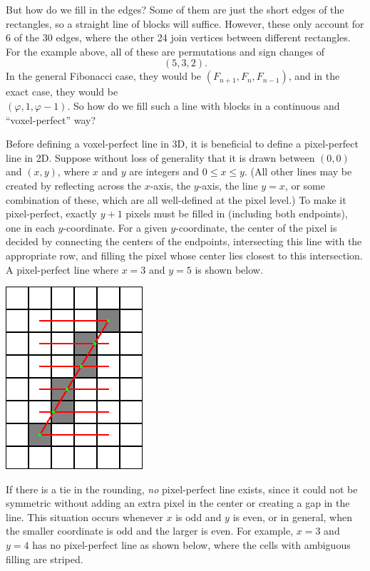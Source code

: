 \documentclass{article}
\begin{document}
But how do we fill in the edges?
Some of them are just the short edges of the rectangles,
so a straight line of blocks will suffice.
However, these only account for 6 of the 30 edges,
where the other 24 join vertices between different rectangles.
For the example above,
all of these are permutations and sign changes of
\[(5, 3, 2).\]
In the general Fibonacci case,
they would be $(F_{n+1}, F_n, F_{n-1})$,
and in the exact case,
they would be \\$(\varphi, 1, \varphi-1)$.
So how do we fill such a line with blocks
in a continuous and ``voxel-perfect'' way?

Before defining a voxel-perfect line in 3D,
it is beneficial to define a pixel-perfect line in 2D.
Suppose without loss of generality
that it is drawn between $(0, 0)$ and $(x, y)$,
where $x$ and $y$ are integers and $0 \leq x \leq y$.
(All other lines may be created by reflecting across
the $x$-axis, the $y$-axis, the line $y=x$,
or some combination of these,
which are all well-defined at the pixel level.)
To make it pixel-perfect,
exactly $y+1$ pixels must be filled in (including both endpoints),
one in each $y$-coordinate.
For a given $y$-coordinate,
the center of the pixel is decided
by connecting the centers of the endpoints,
intersecting this line with the appropriate row,
and filling the pixel whose center lies closest to this intersection.
A pixel-perfect line where $x=3$ and $y=5$ is shown below.

\begin{center}
\includegraphics[width=0.25\linewidth]{grid1.png}
\end{center}

If there is a tie in the rounding, \textit{no} pixel-perfect line exists,
since it could not be symmetric without adding an extra pixel in the center
or creating a gap in the line.
This situation occurs whenever $x$ is odd and $y$ is even,
or in general, when the smaller coordinate is odd and the larger is even.
For example, $x=3$ and $y=4$ has no pixel-perfect line as shown below,
where the cells with ambiguous filling are striped.
\end{document}

